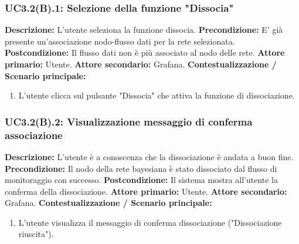                 \subsubsection{UC3.2(B).1: Selezione della funzione "Dissocia"}
                    \textbf{Descrizione:} L’utente seleziona la funzione dissocia.
                    \newline
                    \textbf{Precondizione:}  E' già presente un'associazione nodo-flusso dati per la rete selezionata.
                    \newline
                    \textbf{Postcondizione:} Il flusso dati non è più associato al nodo delle rete.
                    \newline
                    \textbf{Attore primario:} Utente.
                    \newline
                    \textbf{Attore secondario:} Grafana.
                    \newline
                    \textbf{Contestualizzazione / Scenario principale:} \begin{enumerate}
                        \item L’utente clicca sul pulsante "Dissocia" che attiva la funzione di dissociazione.
                    \end{enumerate} 
	           
	                
	            \subsubsection{UC3.2(B).2: Visualizzazione messaggio di conferma associazione}
	                \textbf{Descrizione:} L’utente è a conoscenza che la dissociazione è andata a buon fine.
	                \newline
                    \textbf{Precondizione:} Il nodo della rete bayesiana è stato dissociato dal flusso di monitoraggio con successo.
                    \newline
                    \textbf{Postcondizione:} Il sistema mostra all'utente la conferma della dissociazione.
                    \newline
                    \textbf{Attore primario:} Utente.
                    \newline
                    \textbf{Attore secondario:} Grafana.
                    \newline
                    \textbf{Contestualizzazione / Scenario principale:} \begin{enumerate}
                        \item L'utente visualizza il messaggio di conferma dissociazione ("Dissociazione riuscita").
                    \end{enumerate}
                    
